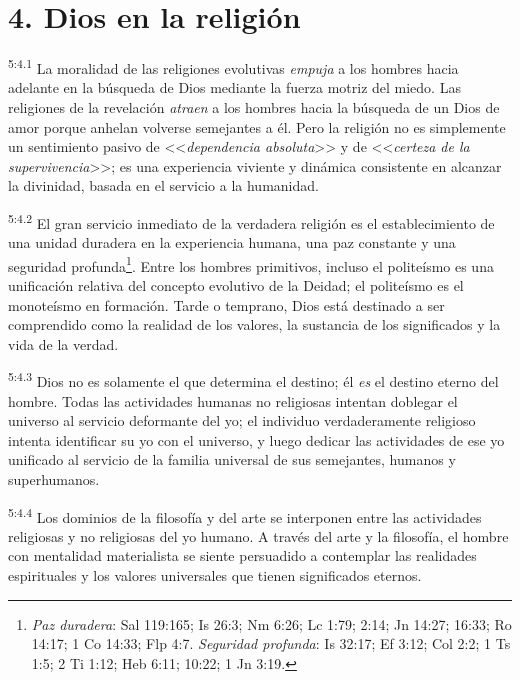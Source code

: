 \section*{4. Dios en la religión}
\par
\textsuperscript{5:4.1} La moralidad de las religiones evolutivas \textit{empuja} a los hombres hacia adelante en la búsqueda de Dios mediante la fuerza motriz del miedo. Las religiones de la revelación \textit{atraen} a los hombres hacia la búsqueda de un Dios de amor porque anhelan volverse semejantes a él. Pero la religión no es simplemente un sentimiento pasivo de <<\textit{dependencia absoluta}>> y de <<\textit{certeza de la supervivencia}>>; es una experiencia viviente y dinámica consistente en alcanzar la divinidad, basada en el servicio a la humanidad.

\par
\textsuperscript{5:4.2} El gran servicio inmediato de la verdadera religión es el establecimiento de una unidad duradera en la experiencia humana, una paz constante y una seguridad profunda\footnote{\textit{Paz duradera}: Sal 119:165; Is 26:3; Nm 6:26; Lc 1:79; 2:14; Jn 14:27; 16:33; Ro 14:17; 1 Co 14:33; Flp 4:7. \textit{Seguridad profunda}: Is 32:17; Ef 3:12; Col 2:2; 1 Ts 1:5; 2 Ti 1:12; Heb 6:11; 10:22; 1 Jn 3:19.}. Entre los hombres primitivos, incluso el politeísmo es una unificación relativa del concepto evolutivo de la Deidad; el politeísmo es el monoteísmo en formación. Tarde o temprano, Dios está destinado a ser comprendido como la realidad de los valores, la sustancia de los significados y la vida de la verdad.

\par
\textsuperscript{5:4.3} Dios no es solamente el que determina el destino; él \textit{es} el destino eterno del hombre. Todas las actividades humanas no religiosas intentan doblegar el universo al servicio deformante del yo; el individuo verdaderamente religioso intenta identificar su yo con el universo, y luego dedicar las actividades de ese yo unificado al servicio de la familia universal de sus semejantes, humanos y superhumanos.

\par
\textsuperscript{5:4.4} Los dominios de la filosofía y del arte se interponen entre las actividades religiosas y no religiosas del yo humano. A través del arte y la filosofía, el hombre con mentalidad materialista se siente persuadido a contemplar las realidades espirituales y los valores universales que tienen significados eternos.

